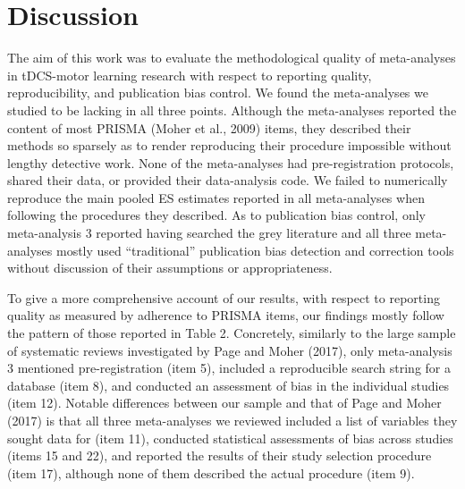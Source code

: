 \documentclass[
  man,floatsintext]{apa6}
\begin{document}
\hypertarget{discussion}{%
\section{Discussion}\label{discussion}}

The aim of this work was to evaluate the methodological quality of meta-analyses in tDCS-motor learning research with respect to reporting quality, reproducibility, and publication bias control. We found the meta-analyses we studied to be lacking in all three points. Although the meta-analyses reported the content of most PRISMA (Moher et al., 2009) items, they described their methods so sparsely as to render reproducing their procedure impossible without lengthy detective work. None of the meta-analyses had pre-registration protocols, shared their data, or provided their data-analysis code. We failed to numerically reproduce the main pooled ES estimates reported in all meta-analyses when following the procedures they described. As to publication bias control, only meta-analysis 3 reported having searched the grey literature and all three meta-analyses mostly used ``traditional'' publication bias detection and correction tools without discussion of their assumptions or appropriateness.

To give a more comprehensive account of our results, with respect to reporting quality as measured by adherence to PRISMA items, our findings mostly follow the pattern of those reported in Table 2. Concretely, similarly to the large sample of systematic reviews investigated by Page and Moher (2017), only meta-analysis 3 mentioned pre-registration (item 5), included a reproducible search string for a database (item 8), and conducted an assessment of bias in the individual studies (item 12). Notable differences between our sample and that of Page and Moher (2017) is that all three meta-analyses we reviewed included a list of variables they sought data for (item 11), conducted statistical assessments of bias across studies (items 15 and 22), and reported the results of their study selection procedure (item 17), although none of them described the actual procedure (item 9).
\end{document}
